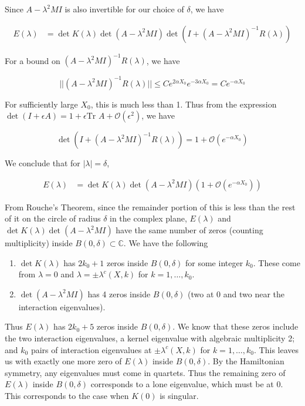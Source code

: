 \documentclass[12pt]{article}
\def\C{{\mathbb C}}
\begin{document}
\begin{enumerate}
Since $A - \lambda^2 MI$ is also invertible for our choice of $\delta$, we have

\begin{align*}
E(\lambda) &= \det K(\lambda) \det(A - \lambda^2 MI) \det (I + (A - \lambda^2 MI)^{-1} R(\lambda) )
\end{align*}

For a bound on $(A - \lambda^2 MI)^{-1} R(\lambda)$, we have

\[
||(A - \lambda^2 MI)^{-1} R(\lambda)|| \leq C e^{2 \alpha X_0} e^{-3 \alpha X_0} = C e^{-\alpha X_0}
\]

For sufficiently large $X_0$, this is much less than 1. Thus from the expression $\det(I + \epsilon A) = 1 + \epsilon \text{Tr }A + \mathcal{O}(\epsilon^2)$, we have

\[
\det (I + (A - \lambda^2 MI)^{-1} R(\lambda) ) 
= 1 + \mathcal{O}\left( e^{-\alpha X_0} \right)
\]

We conclude that for $|\lambda| = \delta$,

\begin{align*}
E(\lambda) &= \det K(\lambda) \det(A - \lambda^2 MI) \left( 1 + \mathcal{O}(e^{-\alpha X_0}) \right)
\end{align*}

From Rouche's Theorem, since the remainder portion of this is less than the rest of it on the circle of radius $\delta$ in the complex plane, $E(\lambda)$ and $\det K(\lambda) \det(A - \lambda^2 MI)$ have the same number of zeros (counting multiplicity) inside $B(0, \delta) \subset \C$. We have the following
\begin{enumerate}
\item $\det K(\lambda)$ has $2k_0 + 1$ zeros inside $B(0, \delta)$ for some integer $k_0$. These come from $\lambda = 0$ and $\lambda = \pm \lambda^c(X, k)$ for $k = 1, \dots, k_0$.
\item $\det(A - \lambda^2 MI)$ has 4 zeros inside $B(0, \delta)$ (two at 0 and two near the interaction eigenvalues).
\end{enumerate}

Thus $E(\lambda)$ has $2k_0 + 5$ zeros inside $B(0, \delta)$. We know that these zeros include the two interaction eigenvalues, a kernel eigenvalue with algebraic multiplicity 2; and $k_0$ pairs of interaction eigenvalues at $\pm \lambda^c(X, k)$ for $k = 1, \dots, k_0$. This leaves us with exactly one more zero of $E(\lambda)$ inside $B(0, \delta)$. By the Hamiltonian symmetry, any eigenvalues must come in quartets. Thus the remaining zero of $E(\lambda)$ inside $B(0, \delta)$ corresponds to a lone eigenvalue, which must be at 0. This corresponds to the case when $K(0)$ is singular.


\end{enumerate}
\end{document}
